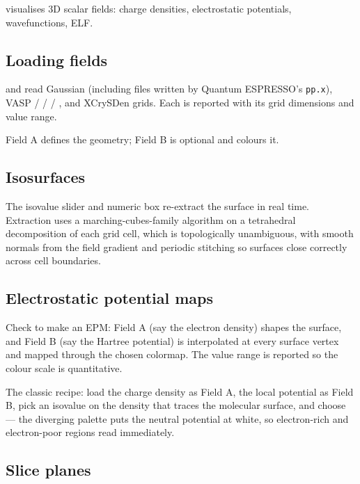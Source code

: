 \menusep{} visualises 3D scalar fields:
charge densities, electrostatic potentials, wavefunctions, ELF.

\subsection{Loading fields}

 and  read Gaussian
 (including files written by Quantum ESPRESSO's \texttt{pp.x}),
VASP  /  /  / , and
XCrySDen  grids. Each is reported with its grid dimensions and
value range.

Field A defines the geometry; Field B is optional and colours it.

\subsection{Isosurfaces}

The isovalue slider and numeric box re-extract the surface in real time.
Extraction uses a marching-cubes-family algorithm on a tetrahedral
decomposition of each grid cell, which is topologically unambiguous, with
smooth normals from the field gradient and periodic stitching so surfaces
close correctly across cell boundaries.

\subsection{Electrostatic potential maps}

Check  to make an EPM: Field A (say
the electron density) shapes the surface, and Field B (say the Hartree
potential) is interpolated at every surface vertex and mapped through the
chosen colormap. The value range is reported so the colour scale is
quantitative.

\begin{caltip}
The classic recipe: load the charge density as Field A, the local potential
as Field B, pick an isovalue on the density that traces the molecular
surface, and choose  --- the diverging palette puts the
neutral potential at white, so electron-rich and electron-poor regions read
immediately.
\end{caltip}

\subsection{Slice planes}

